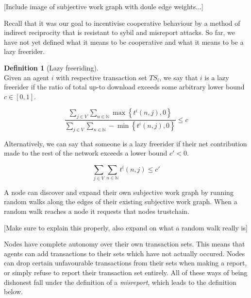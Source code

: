 \documentclass[11pt,a4paper]{report}
\theoremstyle{definition}
\newtheorem{definition}{Definition}[section]
\theoremstyle{theorem}
\theoremstyle{proposition}
\theoremstyle{corollary}
\theoremstyle{lemma}
\theoremstyle{example}
\theoremstyle{remark}
\begin{document}
\noindent{}\begin{center} [Include image of subjective work graph with doule edge weights...] \vspace{1em}\\ \end{center}

\noindent{}Recall that it was our goal to incentivise cooperative behaviour by a method of indirect reciprocity that is resistant to sybil and misreport attacks. So far, we have not yet defined what it means to be cooperative and what it means to be a lazy freerider.\vspace{1em}\\

\begin{definition}[Lazy freeriding]\ \\
Given an agent $i$ with respective transaction set $TS_i$, we say that $i$ is a lazy freerider if the ratio of total up-to download exceeds some arbitrary lower bound $c\in{}[0,1]$. 

\[
\frac{\sum\limits_{j\in{}V}\sum\limits_{n\in\mathbb{N}}\max\left\lbrace{}t^i(n,j), 0\right\rbrace}{\sum\limits_{j\in{}V}\sum\limits_{n\in\mathbb{N}}-\min\left\lbrace{}t^i(n,j), 0\right\rbrace}\leq{}c
\]

\noindent{}Alternatively, we can say that someone is a lazy freerider if their net contribution made to the rest of the network exceeds a lower bound $c' < 0$.

\[
\sum\limits_{j\in{}V}\sum\limits_{n\in\mathbb{N}}t^i(n,j)\leq{}c' 
\]
\end{definition}

\noindent{}A node can discover and expand their own subjective work graph by running random walks along the edges of their existing subjective work graph. When a random walk reaches a node it requests that nodes trustchain. \vspace{1em}\\

\noindent{} \begin{center} [Make sure to explain this properly, also expand on what a random walk really is] \vspace{1em}\\ \end{center}
\noindent{}Nodes have complete autonomy over their own transaction sets. This means that agents can add transactions to their sets which have not actually occured. Nodes can drop certain unfavourable transactions from their sets when making a report, or simply refuse to report their transaction set entirely. All of these ways of being dishonest fall under the definition of a {\it misreport}, which leads to the definition below.
\end{document}
